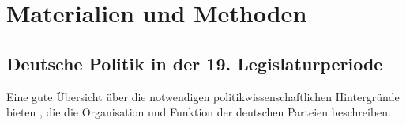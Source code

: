 
\chapter{Materialien und Methoden} \label{ch:materialsAndMethods}







\section{Deutsche Politik in der 19. Legislaturperiode}

Eine gute Übersicht über die notwendigen politikwissenschaftlichen Hintergründe bieten \textcite{bukow_innerparteiliche_2013}, die die Organisation und Funktion der deutschen Parteien beschreiben.

